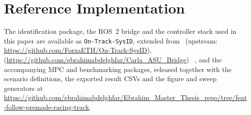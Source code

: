\section{Reference Implementation}
\label{sec:refimpl}

The identification package, the ROS~2 bridge and the controller stack used in
this paper are available as \texttt{On-Track-SysID}, extended
from~\cite{ontrack2025} (upstream:
\url{https://github.com/ForzaETH/On-Track-SysID}), \bridge{}
(\url{https://github.com/ebrahimabdelghfar/Carla_ASU_Bridge})%
~\cite{carlaasubridge}, and the accompanying MPC and benchmarking packages,
released together with the scenario definitions, the exported result CSVs and
the figure and sweep generators at
\url{https://github.com/ebrahimabdelghfar/Ebrahim_Master_Thesis_repo/tree/feat-follow-premade-racing-track}.
